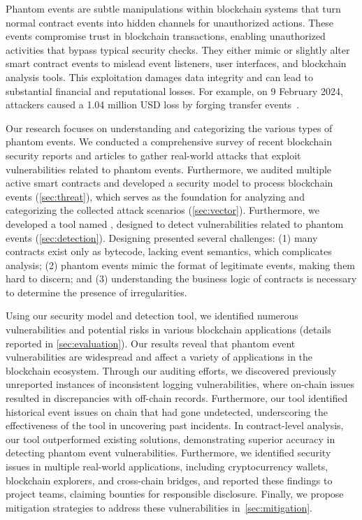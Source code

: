 Phantom events are subtle manipulations within blockchain systems that turn normal contract events
into hidden channels for unauthorized actions. These events compromise trust in blockchain
transactions, enabling unauthorized activities that bypass typical security checks. They either
mimic or slightly alter smart contract events to mislead event listeners, user interfaces, and
blockchain analysis tools. This exploitation damages data integrity and can lead to substantial
financial and reputational losses.
For example, on 9 February 2024, attackers caused a 1.04 million USD loss by forging transfer
events~\cite{zero_transfer}.

Our research focuses on understanding and categorizing the various types of phantom events.
We conducted a comprehensive survey of recent blockchain security reports and articles to gather
real-world attacks that exploit vulnerabilities related to phantom events.
Furthermore, we audited multiple active smart contracts and developed a security model to process
blockchain events (\cref{sec:threat}), which serves as the foundation for analyzing and
categorizing the collected attack scenarios (\cref{sec:vector}).
Furthermore, we developed a tool named \tool, designed to detect vulnerabilities related to phantom
events (\cref{sec:detection}).
Designing \tool presented several challenges: (1) many contracts exist only as bytecode, lacking
event semantics, which complicates analysis; (2) phantom events mimic the format of legitimate
events, making them hard to discern; and (3) understanding the business logic of contracts is
necessary to determine the presence of irregularities.

Using our security model and detection tool, we identified numerous vulnerabilities and potential
risks in various blockchain applications (details reported in \cref{sec:evaluation}).
Our results reveal that phantom event vulnerabilities are widespread and affect a variety of
applications in the blockchain ecosystem. Through our auditing efforts, we discovered previously
unreported instances of inconsistent logging vulnerabilities, where on-chain issues resulted in
discrepancies with off-chain records.
Furthermore, our tool identified historical event issues on chain that had gone undetected,
underscoring the effectiveness of the tool in uncovering past incidents.
In contract-level analysis, our tool outperformed existing solutions, demonstrating superior
accuracy in detecting phantom event vulnerabilities.
Furthermore, we identified security issues in multiple real-world applications, including
cryptocurrency wallets, blockchain explorers, and cross-chain bridges, and reported these findings
to project teams, claiming bounties for responsible disclosure.
Finally, we propose mitigation strategies to address these vulnerabilities in~\cref{sec:mitigation}.

